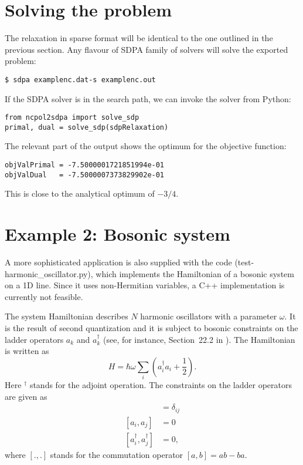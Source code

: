 \documentclass{article}
\begin{document}
\section{Solving the problem}
The relaxation in sparse format will be identical to the one outlined in the previous section. Any flavour of SDPA family of solvers will solve the exported problem:
\begin{verbatim}
$ sdpa examplenc.dat-s examplenc.out
\end{verbatim}

If the SDPA solver is in the search path, we can invoke the solver from Python:
\begin{verbatim}
from ncpol2sdpa import solve_sdp
primal, dual = solve_sdp(sdpRelaxation)
\end{verbatim}

The relevant part of the output shows the optimum for the objective function:
\begin{verbatim}
objValPrimal = -7.5000001721851994e-01
objValDual   = -7.5000007373829902e-01
\end{verbatim}
This is close to the analytical optimum of $-3/4$.

\section{Example 2: Bosonic system}
A more sophisticated application is  also supplied with the code (test-harmonic\_oscillator.py), which implements the Hamiltonian of a bosonic system on a 1D line. Since it uses non-Hermitian variables, a C++ implementation is currently not feasible.

The system Hamiltonian describes $N$ harmonic oscillators with a parameter $\omega$. It is the result of second quantization and it is subject to bosonic constraints on the ladder operators $a_{k}$ and $a_{k}^{\dagger}$ (see, for instance, Section~22.2 in \cite{fayngold2013quantum}). The Hamiltonian is written as
\begin{equation}
  H = \hbar \omega\sum_{i}\left(a_{i}^{\dagger}a_{i}+\frac{1}{2}\right).
\end{equation}
Here $^{\dagger}$ stands for the adjoint operation. The constraints on the ladder operators are given as
\begin{align}
[a_{i},a_{j}^{\dagger}] &=  \delta_{ij} \\
[a_{i},a_{j}]  &=  0 \nonumber \\
[a_{i}^{\dagger},a_{j}^{\dagger}] &=  0,\nonumber
\end{align}
where $[.,.]$ stands for the commutation operator $[a,b]=ab-ba$. 
\end{document}
